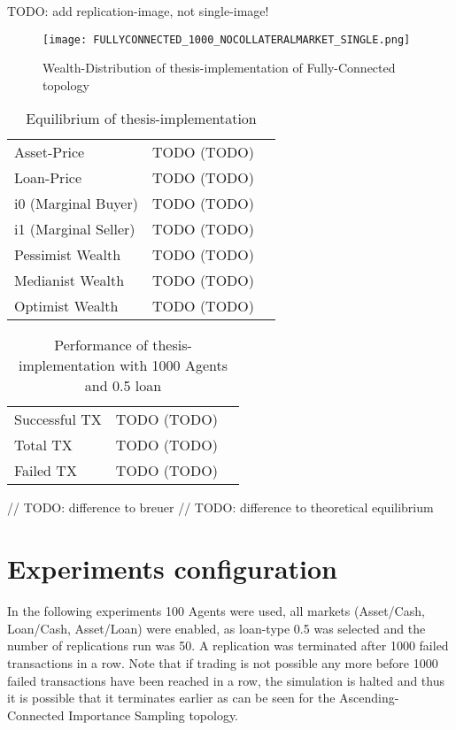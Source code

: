 \documentclass[Bachelorarbeit.tex]{subfiles}
\begin{document}
TODO: add replication-image, not single-image!

\begin{figure}[H]
	\centering
  \texttt{[image: FULLYCONNECTED\_1000\_NOCOLLATERALMARKET\_SINGLE.png]}
	\caption{Wealth-Distribution of thesis-implementation of Fully-Connected topology}
	\label{fig1}
\end{figure}

\begin{table}[h]
	\centering
	\caption{Equilibrium of thesis-implementation}
	\begin{tabular} { l c r }
		\hline
		Asset-Price & TODO (TODO) \\
		Loan-Price & TODO (TODO) \\
		i0 (Marginal Buyer) & TODO (TODO) \\
		i1 (Marginal Seller) & TODO (TODO) \\
		Pessimist Wealth & TODO (TODO) \\
		Medianist Wealth & TODO (TODO) \\
		Optimist Wealth & TODO (TODO) \\
		\hline
	\end{tabular}
\end{table}

\begin{table}[h]
	\centering
	\caption{Performance of thesis-implementation with 1000 Agents and 0.5 loan}
	\begin{tabular} { l c r }
		\hline
		Successful TX & TODO (TODO) \\
		Total TX & TODO (TODO) \\
		Failed TX & TODO (TODO) \\
		\hline
	\end{tabular}
\end{table}


// TODO: difference to breuer 
// TODO: difference to theoretical equilibrium

\section{Experiments configuration}
In the following experiments 100 Agents were used, all markets (Asset/Cash, Loan/Cash, Asset/Loan) were enabled, as loan-type 0.5 was selected and the number of replications run was 50. A replication was terminated after 1000 failed transactions in a row. Note that if trading is not possible any more before  1000 failed transactions have been reached in a row, the simulation is halted and thus it is possible that it terminates earlier as can be seen for the Ascending-Connected Importance Sampling topology.
\end{document}
